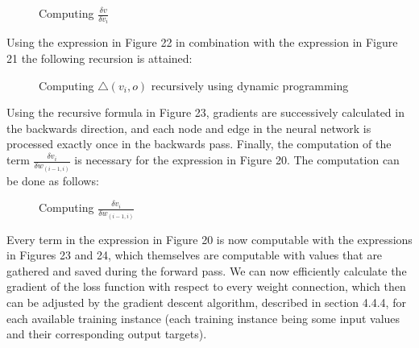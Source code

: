 \documentclass[titlepage]{article}
\begin{document}
\vskip 0.2cm

\begin{figure}[h]
    \centerline{}
    \vskip 0.2cm
    \caption{Computing $\frac{\delta v}{\delta v_{i}}$}
\end{figure}

\vskip 0.3cm

\noindent
Using the expression in Figure 22 in combination with the expression in Figure 21 the following recursion is attained:

\vskip 0.3cm

\begin{figure}[h]
    \centerline{
    }
    \vskip 0.3cm
    \caption{Computing $\triangle (v_{i}, o)$ recursively using dynamic programming}
\end{figure}

\vskip 0.2cm

\noindent
Using the recursive formula in Figure 23, gradients are successively calculated in the backwards direction, and each node and edge in the neural network is processed exactly once in the backwards pass. Finally, the computation of the term $\frac{\delta v_{i}}{\delta w_{(i-1, i)}}$ is necessary for the expression in Figure 20. The computation can be done as follows:

\vskip 0.3cm

\begin{figure}[h]
    \centerline{}
    \vskip 0.3cm
    \caption{Computing $\frac{\delta v_{i}}{\delta w_{(i-1, i)}}$}
\end{figure}

\vskip 0.2cm

\noindent
Every term in the expression in Figure 20 is now computable with the expressions in Figures 23 and 24, which themselves are computable with values that are gathered and saved during the forward pass. We can now efficiently calculate the gradient of the loss function with respect to every weight connection, which then can be adjusted by the gradient descent algorithm, described in section 4.4.4, for each available training instance (each training instance being some input values and their corresponding output targets).
\end{document}
